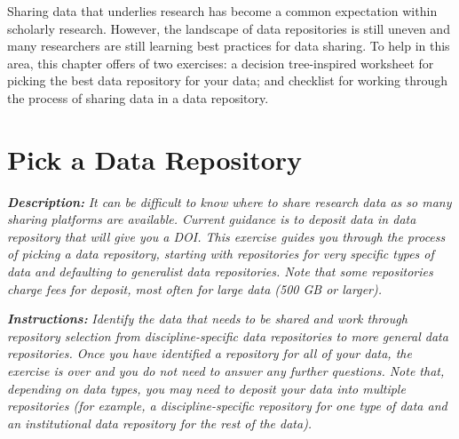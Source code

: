 \documentclass[
]{book}
\begin{document}
Sharing data that underlies research has become a common expectation within scholarly research. However, the landscape of data repositories is still uneven and many researchers are still learning best practices for data sharing. To help in this area, this chapter offers of two exercises: a decision tree-inspired worksheet for picking the best data repository for your data; and checklist for working through the process of sharing data in a data repository.

\hypertarget{data-repository}{%
\section{Pick a Data Repository}\label{data-repository}}

\textbf{\emph{Description:}} \emph{It can be difficult to know where to share research data as so many sharing platforms are available. Current guidance is to deposit data in data repository that will give you a DOI. This exercise guides you through the process of picking a data repository, starting with repositories for very specific types of data and defaulting to generalist data repositories. Note that some repositories charge fees for deposit, most often for large data (500 GB or larger).}

\textbf{\emph{Instructions:}} \emph{Identify the data that needs to be shared and work through repository selection from discipline-specific data repositories to more general data repositories. Once you have identified a repository for all of your data, the exercise is over and you do not need to answer any further questions. Note that, depending on data types, you may need to deposit your data into multiple repositories (for example, a discipline-specific repository for one type of data and an institutional data repository for the rest of the data).}
\end{document}
